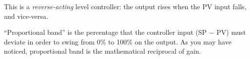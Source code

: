 





This is a {\it reverse-acting} level controller: the output rises when the PV input falls, and vice-versa.

\vskip 10pt

``Proportional band'' is the percentage that the controller input (SP $-$ PV) must deviate in order to swing from 0\% to 100\% on the output.  As you may have noticed, proportional band is the mathematical reciprocal of gain.














